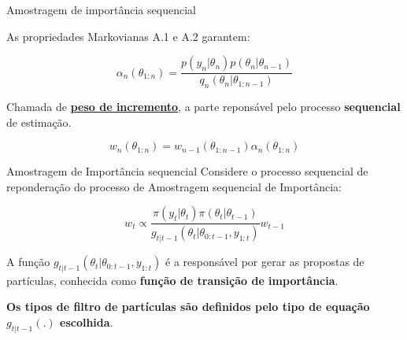 \documentclass{beamer}
\begin{document}
\begin{frame}{Amostragem de importância sequencial}

As propriedades Markovianas A.1 e A.2 garantem:

$$
\alpha_n(\theta_{1:n}) = \frac{p(y_{n}|\theta_n)p(\theta_{n}|\theta_{n-1})}{q_n(\theta_n|\theta_{1:n-1})}
$$

\pause

Chamada de \underline{\textbf{peso de incremento}}, a parte reponsável pelo processo \textbf{sequencial} de estimação.


$$
w_n(\theta_{1:n}) = w_{n-1}(\theta_{1:n-1}) \alpha_n(\theta_{1:n})
$$


\end{frame}

\begin{frame}{Amostragem de Importância sequencial}
Considere o processo sequencial de reponderação do processo de Amostragem sequencial de Importância:

$$
w_t \propto \frac{\pi(y_t|\theta_t)\pi(\theta_t|\theta_{t-1})}{g_{t|t-1}(\theta_t|\theta_{0:t-1},y_{1:t})} w_{t-1}
$$

\pause

A função $g_{t|t-1}(\theta_t|\theta_{0:t-1},y_{1:t})$ é a responsável por gerar as propostas de partículas, conhecida como \textbf{função de transição de importância}.

\vspace{0.5cm} 

\pause

\textbf{Os tipos de filtro de partículas são definidos pelo tipo de equação $g_{t|t-1}(.)$ escolhida}.

\end{frame}
\end{document}
